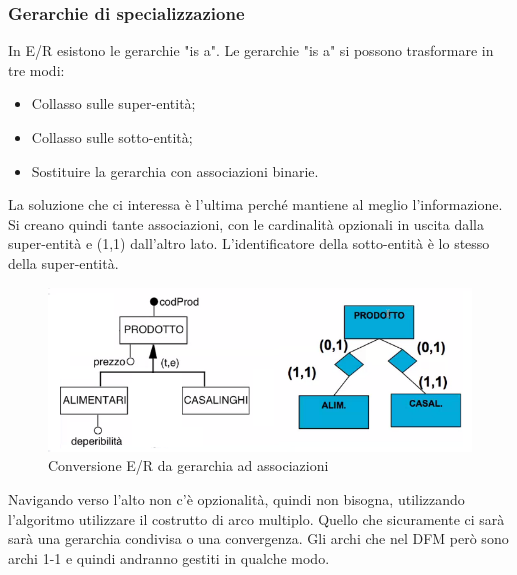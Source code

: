 \subsubsection{Gerarchie di specializzazione}
In E/R esistono le gerarchie "is a". Le gerarchie "is a" si possono trasformare in tre modi:
\begin{itemize}
	\item Collasso sulle super-entità;
	\item Collasso sulle sotto-entità;
	\item Sostituire la gerarchia con associazioni binarie.
\end{itemize}
La soluzione che ci interessa è l'ultima perché mantiene al meglio l'informazione. Si creano quindi tante associazioni, con le cardinalità opzionali in uscita dalla super-entità e (1,1) dall'altro lato. L'identificatore della sotto-entità è lo stesso della super-entità.
\begin{figure}[H]
	\begin{center}
		\includegraphics[width=0.8\linewidth]{img/isaconversion.png}
		\caption{Conversione E/R da gerarchia ad associazioni}
	\end{center}
\end{figure}
\begin{warn}
	Navigando verso l'alto non c'è opzionalità, quindi non bisogna, utilizzando l'algoritmo utilizzare il costrutto di arco multiplo. Quello che sicuramente ci sarà sarà una gerarchia condivisa o una convergenza. Gli archi che nel DFM però sono archi 1-1 e quindi andranno gestiti in qualche modo.
\end{warn}
